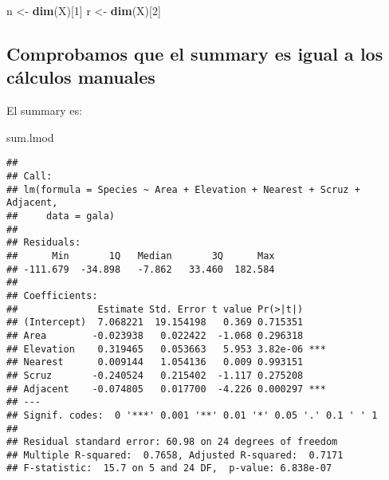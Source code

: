 \documentclass[
]{article}
\newenvironment{Shaded}{\begin{snugshade}}{\end{snugshade}}
\newcommand{\DecValTok}[1]{\textcolor[rgb]{0.00,0.00,0.81}{#1}}
\newcommand{\FunctionTok}[1]{\textcolor[rgb]{0.13,0.29,0.53}{\textbf{#1}}}
\newcommand{\NormalTok}[1]{#1}
\newcommand{\OtherTok}[1]{\textcolor[rgb]{0.56,0.35,0.01}{#1}}
\newcommand{\SpecialCharTok}[1]{\textcolor[rgb]{0.81,0.36,0.00}{\textbf{#1}}}
\begin{document}
\begin{Shaded}
\begin{Highlighting}[]
\NormalTok{n }\OtherTok{\textless{}{-}} \FunctionTok{dim}\NormalTok{(X)[}\DecValTok{1}\NormalTok{]}
\NormalTok{r }\OtherTok{\textless{}{-}} \FunctionTok{dim}\NormalTok{(X)[}\DecValTok{2}\NormalTok{] }
\end{Highlighting}
\end{Shaded}

\hypertarget{comprobamos-que-el-summary-es-igual-a-los-cuxe1lculos-manuales}{%
\subsection{Comprobamos que el summary es igual a los cálculos
manuales}\label{comprobamos-que-el-summary-es-igual-a-los-cuxe1lculos-manuales}}

\begin{Shaded}
\end{Shaded}

El summary es:

\begin{Shaded}
\begin{Highlighting}[]
\NormalTok{sum.lmod}
\end{Highlighting}
\end{Shaded}

\begin{verbatim}
## 
## Call:
## lm(formula = Species ~ Area + Elevation + Nearest + Scruz + Adjacent, 
##     data = gala)
## 
## Residuals:
##      Min       1Q   Median       3Q      Max 
## -111.679  -34.898   -7.862   33.460  182.584 
## 
## Coefficients:
##              Estimate Std. Error t value Pr(>|t|)    
## (Intercept)  7.068221  19.154198   0.369 0.715351    
## Area        -0.023938   0.022422  -1.068 0.296318    
## Elevation    0.319465   0.053663   5.953 3.82e-06 ***
## Nearest      0.009144   1.054136   0.009 0.993151    
## Scruz       -0.240524   0.215402  -1.117 0.275208    
## Adjacent    -0.074805   0.017700  -4.226 0.000297 ***
## ---
## Signif. codes:  0 '***' 0.001 '**' 0.01 '*' 0.05 '.' 0.1 ' ' 1
## 
## Residual standard error: 60.98 on 24 degrees of freedom
## Multiple R-squared:  0.7658, Adjusted R-squared:  0.7171 
## F-statistic:  15.7 on 5 and 24 DF,  p-value: 6.838e-07
\end{verbatim}
\end{document}
